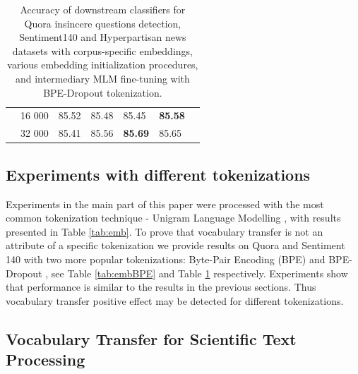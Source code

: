 \documentclass[review]{elsarticle}
\begin{document}
\begin{table}[h]
\begin{tabular}{lllllll}
                                                                       & 16 000 & 85.52 & 85.48 & 85.45 & \textbf{85.58} \\
                                                                       & 32 000 & 85.41 & 85.56 & \textbf{85.69} & 85.65   \\ \hline
\end{tabular}
\caption{Accuracy of downstream classifiers for Quora insincere questions detection, Sentiment140  and Hyperpartisan news datasets with corpus-specific embeddings, various embedding initialization procedures, and intermediary MLM fine-tuning with BPE-Dropout tokenization.}
  \label{tab:embBPEDropout}
\end{table}


\subsection{Experiments with different tokenizations}
\label{sec:diftok}
Experiments in the main part of this paper were processed with the most common tokenization technique - Unigram Language Modelling \cite{kudo2018subword}, with results presented in Table \ref{tab:emb}. To prove that vocabulary transfer is not an attribute of a specific tokenization we provide results on Quora and Sentiment 140 with two more popular tokenizations: Byte-Pair Encoding (BPE) \cite{sennrich-etal-2016-neural} and BPE-Dropout \cite{provilkov2020bpe}, see Table \ref{tab:embBPE} and Table \ref{tab:embBPEDropout} respectively. Experiments show that performance is similar to the results in the previous sections. Thus vocabulary transfer positive effect may be detected for different tokenizations. 


\subsection{Vocabulary Transfer for Scientific Text Processing} \label{sec:sc}
\end{document}
